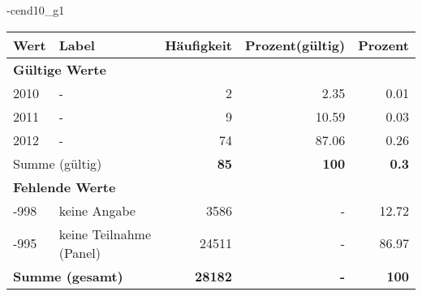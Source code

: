                 \vspace*{-\baselineskip}
					\begin{filecontents}{\jobname-cend10_g1}
					\begin{longtable}{lXrrr}
					\toprule
					\textbf{Wert} & \textbf{Label} & \textbf{Häufigkeit} & \textbf{Prozent(gültig)} & \textbf{Prozent} \\
					\endhead
					\midrule
					\multicolumn{5}{l}{\textbf{Gültige Werte}}\\

					2010 &
					\multicolumn{1}{X}{ -  } &


					  \num{2} &
					  \num[round-mode=places,round-precision=2]{2.35} &
					    \num[round-mode=places,round-precision=2]{0.01} \\

					2011 &
					\multicolumn{1}{X}{ -  } &


					  \num{9} &
					  \num[round-mode=places,round-precision=2]{10.59} &
					    \num[round-mode=places,round-precision=2]{0.03} \\

					2012 &
					\multicolumn{1}{X}{ -  } &


					  \num{74} &
					  \num[round-mode=places,round-precision=2]{87.06} &
					    \num[round-mode=places,round-precision=2]{0.26} \\
					\midrule
					\multicolumn{2}{l}{Summe (gültig)} &
					  \textbf{\num{85}} &
					\textbf{\num{100}} &
					  \textbf{\num[round-mode=places,round-precision=2]{0.3}} \\
					\multicolumn{5}{l}{\textbf{Fehlende Werte}}\\
							-998 &
							keine Angabe &
							  \num{3586} &
							 - &
							  \num[round-mode=places,round-precision=2]{12.72} \\
							-995 &
							keine Teilnahme (Panel) &
							  \num{24511} &
							 - &
							  \num[round-mode=places,round-precision=2]{86.97} \\
					\midrule
					\multicolumn{2}{l}{\textbf{Summe (gesamt)}} &
				      \textbf{\num{28182}} &
				    \textbf{-} &
				    \textbf{\num{100}} \\
					\bottomrule
					\end{longtable}
					\end{filecontents}
